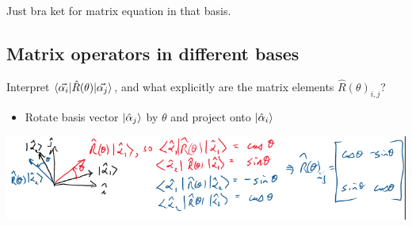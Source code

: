 \documentclass{article}
\begin{document}
Just bra ket for matrix equation in that basis. 

\subsection{Matrix operators in different bases}

Interpret $\braket{\vec{\alpha_i} | \hat{R}(\theta) | \vec{\alpha_j}}$, and what explicitly are the matrix elements $\hat{R}(\theta)_{i,j}$?

\begin{itemize}
    \item Rotate basis vector $\ket{\hat{\alpha}_j}$ by $\theta$ and project onto $\ket{\hat{\alpha}_i}$
\end{itemize}

\includegraphics[width = 0.98 \textwidth]{Lecture11/4.png}
\end{document}
